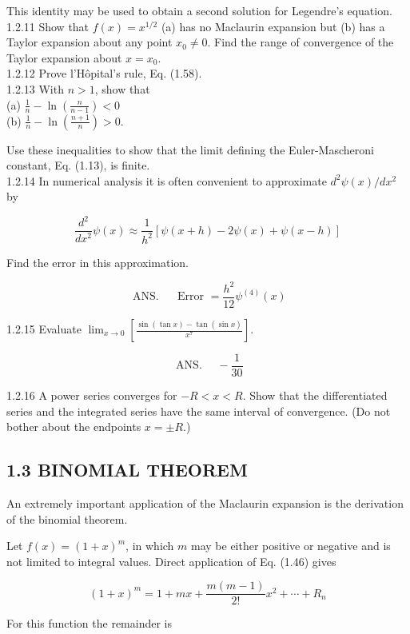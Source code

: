\documentclass[10pt]{article}
\begin{document}
This identity may be used to obtain a second solution for Legendre's equation.\\
1.2.11 Show that $f(x)=x^{1 / 2}$ (a) has no Maclaurin expansion but (b) has a Taylor expansion about any point $x_{0} \neq 0$. Find the range of convergence of the Taylor expansion about $x=x_{0}$.\\
1.2.12 Prove l'Hôpital's rule, Eq. (1.58).\\
1.2.13 With $n>1$, show that\\
(a) $\frac{1}{n}-\ln \left(\frac{n}{n-1}\right)<0$\\
(b) $\frac{1}{n}-\ln \left(\frac{n+1}{n}\right)>0$.

Use these inequalities to show that the limit defining the Euler-Mascheroni constant, Eq. (1.13), is finite.\\
1.2.14 In numerical analysis it is often convenient to approximate $d^{2} \psi(x) / d x^{2}$ by

$$
\frac{d^{2}}{d x^{2}} \psi(x) \approx \frac{1}{h^{2}}[\psi(x+h)-2 \psi(x)+\psi(x-h)]
$$

Find the error in this approximation.

$$
\text { ANS. } \quad \text { Error }=\frac{h^{2}}{12} \psi^{(4)}(x)
$$

1.2.15 Evaluate $\lim _{x \rightarrow 0}\left[\frac{\sin (\tan x)-\tan (\sin x)}{x^{7}}\right]$.

$$
\text { ANS. } \quad-\frac{1}{30}
$$

1.2.16 A power series converges for $-R<x<R$. Show that the differentiated series and the integrated series have the same interval of convergence. (Do not bother about the endpoints $x= \pm R$.)

\subsection*{1.3 BINOMIAL THEOREM}
An extremely important application of the Maclaurin expansion is the derivation of the binomial theorem.

Let $f(x)=(1+x)^{m}$, in which $m$ may be either positive or negative and is not limited to integral values. Direct application of Eq. (1.46) gives


\begin{equation*}
(1+x)^{m}=1+m x+\frac{m(m-1)}{2!} x^{2}+\cdots+R_{n} \tag{1.64}
\end{equation*}


For this function the remainder is
\end{document}
